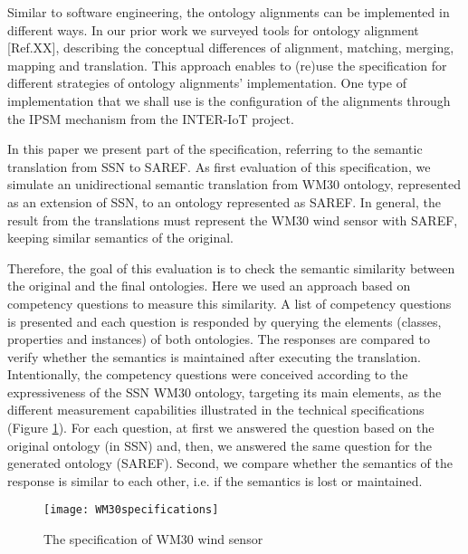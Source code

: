 \documentclass{sig-alternate-05-2015}
\begin{document}
Similar to software engineering, the ontology alignments can be implemented in different ways. In our prior work we surveyed tools for ontology alignment [Ref.XX], describing the conceptual differences of alignment, matching, merging, mapping and translation. This approach enables to (re)use the specification for different strategies of ontology alignments’ implementation. One type of implementation that we shall use is the configuration of the alignments through the IPSM mechanism from the INTER-IoT project. 

In this paper we present part of the specification, referring to the semantic translation from SSN to SAREF. As first evaluation of this specification, we simulate an unidirectional semantic translation from WM30 ontology, represented as an extension of SSN, to an ontology represented as SAREF. In general, the result from the translations must represent the WM30 wind sensor with SAREF, keeping similar semantics of the original. 

Therefore, the goal of this evaluation is to check the semantic similarity between the original and the final ontologies. Here we used an approach based on competency questions to measure this similarity. A list of competency questions is presented and each question is responded by querying the elements (classes, properties and instances) of both ontologies. The responses are compared to verify whether the semantics is maintained after executing the translation. Intentionally, the competency questions were conceived according to the expressiveness of the SSN WM30 ontology, targeting its main elements, as the different measurement capabilities illustrated in the technical specifications (Figure \ref{fig:WM30specifications}). For each question, at first we answered the question based on the original ontology (in SSN) and, then, we answered the same question for the generated ontology (SAREF). Second, we compare whether the semantics of the response is similar to each other, i.e. if the semantics is lost or maintained. 

\begin{figure}[h!]
\centering
\texttt{[image: WM30specifications]}
\caption{The specification of WM30 wind sensor}
\label{fig:WM30specifications}
\end{figure}
\end{document}
